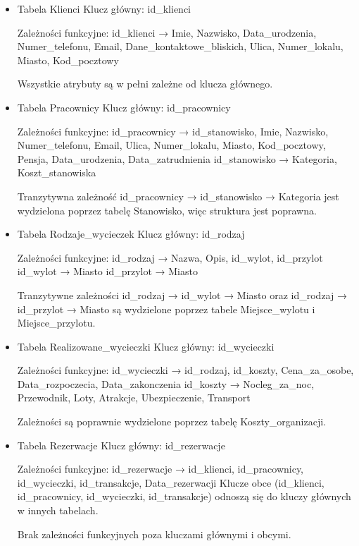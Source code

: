 \documentclass{article}
\theoremstyle{definition}
\begin{document}
	\begin{itemize}
	\item Tabela Klienci
	Klucz główny: id\_klienci
	
	Zależności funkcyjne:
	id\_klienci → {Imie, Nazwisko, Data\_urodzenia, Numer\_telefonu, Email, Dane\_kontaktowe\_bliskich, Ulica, Numer\_lokalu, Miasto, Kod\_pocztowy}
	
	Wszystkie atrybuty są w pełni zależne od klucza głównego.
	
	\item Tabela Pracownicy
	Klucz główny: id\_pracownicy
	
	Zależności funkcyjne:
	id\_pracownicy → {id\_stanowisko, Imie, Nazwisko, Numer\_telefonu, Email, Ulica, Numer\_lokalu, Miasto, Kod\_pocztowy, Pensja, Data\_urodzenia, Data\_zatrudnienia}
	id\_stanowisko → {Kategoria, Koszt\_stanowiska}
	
	Tranzytywna zależność id\_pracownicy → id\_stanowisko → Kategoria jest wydzielona poprzez tabelę Stanowisko, więc struktura jest poprawna.
	
	\item Tabela Rodzaje\_wycieczek
	Klucz główny: id\_rodzaj
	
	Zależności funkcyjne:
	id\_rodzaj → {Nazwa, Opis, id\_wylot, id\_przylot}
	id\_wylot → Miasto 
	id\_przylot → Miasto 
	
	Tranzytywne zależności id\_rodzaj → id\_wylot → Miasto oraz id\_rodzaj → id\_przylot → Miasto są wydzielone poprzez tabele Miejsce\_wylotu i Miejsce\_przylotu.
	
	\item Tabela Realizowane\_wycieczki
	Klucz główny: id\_wycieczki
	
	Zależności funkcyjne:
	id\_wycieczki → {id\_rodzaj, id\_koszty, Cena\_za\_osobe, Data\_rozpoczecia, Data\_zakonczenia}
	id\_koszty → {Nocleg\_za\_noc, Przewodnik, Loty, Atrakcje, Ubezpieczenie, Transport} 
	
	Zależności są poprawnie wydzielone poprzez tabelę Koszty\_organizacji.
	
	\item Tabela Rezerwacje
	Klucz główny: id\_rezerwacje
	
	Zależności funkcyjne:
	id\_rezerwacje → {id\_klienci, id\_pracownicy, id\_wycieczki, id\_transakcje, Data\_rezerwacji}
	Klucze obce (id\_klienci, id\_pracownicy, id\_wycieczki, id\_transakcje) odnoszą się do kluczy głównych w innych tabelach.
	
	Brak zależności funkcyjnych poza kluczami głównymi i obcymi. 
	

\end{itemize}
\end{document}
